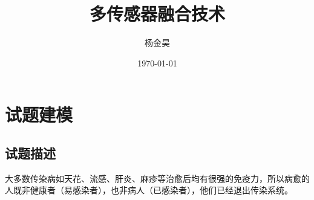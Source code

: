 \documentclass[supercite]{HustGraduPaper}
\title{多传感器融合技术}
\author{杨金昊} %
\date{\today} %
\begin{document}
	\maketitle[logo color= black]

	\clearpage %

	\tableofcontents
	
	\clearpage%

	\section{试题建模}

	\subsection{试题描述}
		大多数传染病如天花、流感、肝炎、麻疹等治愈后均有很强的免疫力，所以病愈的人既非健康者（易感染者），也非病人（已感染者），他们已经退出传染系统。
\end{document}
